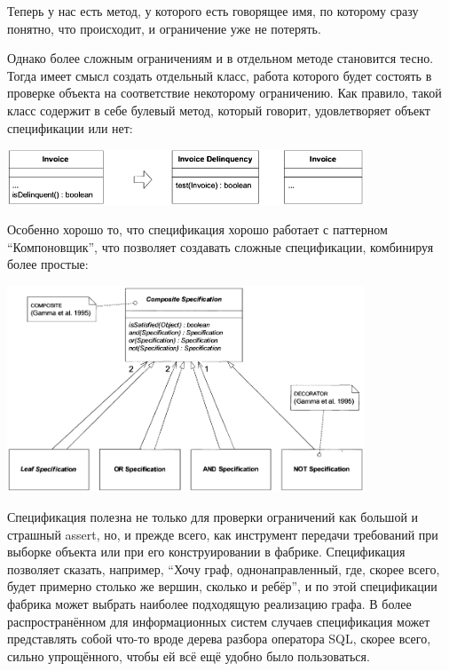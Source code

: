 \documentclass[a5paper]{article}
\begin{document}
Теперь у нас есть метод, у которого есть говорящее имя, по которому сразу понятно, что происходит, и ограничение уже не потерять.

Однако более сложным ограничениям и в отдельном методе становится тесно. Тогда имеет смысл создать отдельный класс, работа которого будет состоять в проверке объекта на соответствие некоторому ограничению. Как правило, такой класс содержит в себе булевый метод, который говорит, удовлетворяет объект спецификации или нет:

\begin{center}
    \includegraphics[width=0.8\textwidth]{specification.png}
\end{center}

Особенно хорошо то, что спецификация хорошо работает с паттерном ``Компоновщик'', что позволяет создавать сложные спецификации, комбинируя более простые:

\begin{center}
    \includegraphics[width=0.8\textwidth]{compositeSpecifications.png}
\end{center}

Спецификация полезна не только для проверки ограничений как большой и страшный assert, но, и прежде всего, как инструмент передачи требований при выборке объекта или при его конструировании в фабрике. Спецификация позволяет сказать, например, ``Хочу граф, однонаправленный, где, скорее всего, будет примерно столько же вершин, сколько и ребёр'', и по этой спецификации фабрика может выбрать наиболее подходящую реализацию графа. В более распространённом для информационных систем случаев спецификация может представлять собой что-то вроде дерева разбора оператора SQL, скорее всего, сильно упрощённого, чтобы ей всё ещё удобно было пользоваться.
\end{document}
